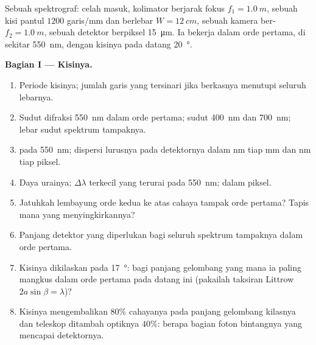 \begin{problem}
\label{pb:b2:gratings:1}

Sebuah spektrograf: celah masuk, kolimator berjarak fokus $f_1 =
\qty{1.0}{m}$, sebuah kisi pantul $1200$ garis/mm dan berlebar $W =
\qty{12}{cm}$, sebuah kamera ber-$f_2 = \qty{1.0}{m}$, sebuah detektor berpiksel \qty{15}{\micro m}.
Ia bekerja dalam orde pertama, di sekitar \qty{550}{nm}, dengan
kisinya pada datang \qty{20}{\degree}.

\medskip
\noindent\textbf{Bagian I --- Kisinya.}
\begin{enumerate}
  \item Periode kisinya; jumlah garis yang tersinari jika berkasnya menutupi
        seluruh lebarnya.
  \item Sudut difraksi \qty{550}{nm} dalam orde pertama; sudut
        \qty{400}{nm} dan \qty{700}{nm}; lebar sudut spektrum
        tampaknya.
  \item {} pada \qty{550}{nm}; dispersi lurusnya pada
        detektornya dalam nm tiap mm dan nm tiap piksel.
  \item Daya urainya; $\Delta\lambda$ terkecil yang terurai pada \qty{550}{nm}; dalam
        piksel.
  \item Jatuhkah lembayung orde kedua ke atas cahaya tampak orde
        pertama? Tapis mana yang menyingkirkannya?
  \item Panjang detektor yang diperlukan bagi seluruh spektrum tampaknya dalam
        orde pertama.
  \item Kisinya dikilaskan pada \qty{17}{\degree}: bagi panjang gelombang yang mana ia
        paling mangkus dalam orde pertama pada datang ini (pakailah
        taksiran Littrow $2a\sin\beta = \lambda$)?
  \item Kisinya mengembalikan $80\%$ cahayanya pada panjang gelombang kilasnya
        dan teleskop ditambah optiknya $40\%$: berapa bagian foton bintangnya
        yang mencapai detektornya.
\end{enumerate}


\end{problem}
